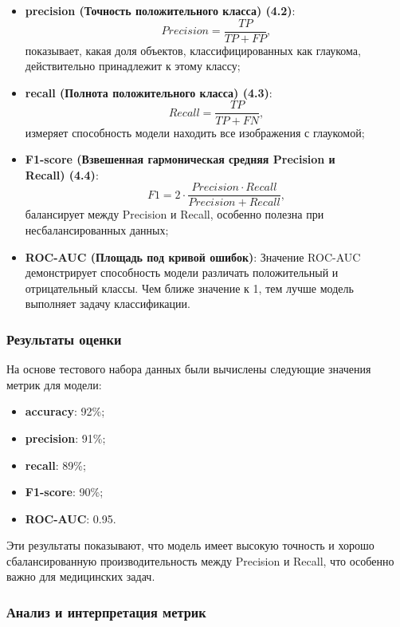{\begin{itemize}
        \item \textbf{precision (Точность положительного класса) (4.2)}:
        \[
        Precision = \frac{TP}{TP + FP}, \tag{4.2}
        \]
        показывает, какая доля объектов, классифицированных как глаукома, действительно принадлежит к этому классу;

        \item \textbf{recall (Полнота положительного класса) (4.3)}:
        \[
        Recall = \frac{TP}{TP + FN}, \tag{4.3}
        \]
        измеряет способность модели находить все изображения с глаукомой;

        \item \textbf{F1-score (Взвешенная гармоническая средняя Precision и \\ Recall) (4.4)}:
        \[
        F1 = 2 \cdot \frac{Precision \cdot Recall}{Precision + Recall}, \tag{4.4}
        \]
        балансирует между Precision и Recall, особенно полезна при несбалансированных данных;

        \item \textbf{ROC-AUC (Площадь под кривой ошибок)}:
        Значение ROC-AUC демонстрирует способность модели различать положительный и отрицательный классы. Чем ближе значение к 1, тем лучше модель выполняет задачу классификации.
    \end{itemize}

    \subsubsection*{Результаты оценки}

    На основе тестового набора данных были вычислены следующие значения метрик для модели:

    \begin{itemize}
        \item \textbf{accuracy}: 92\%;
        \item \textbf{precision}: 91\%;
        \item \textbf{recall}: 89\%;
        \item \textbf{F1-score}: 90\%;
        \item \textbf{ROC-AUC}: 0.95.
    \end{itemize}

    Эти результаты показывают, что модель имеет высокую точность и хорошо сбалансированную производительность между Precision и Recall, что особенно важно для медицинских задач.

    \subsubsection*{Анализ и интерпретация метрик}

}
